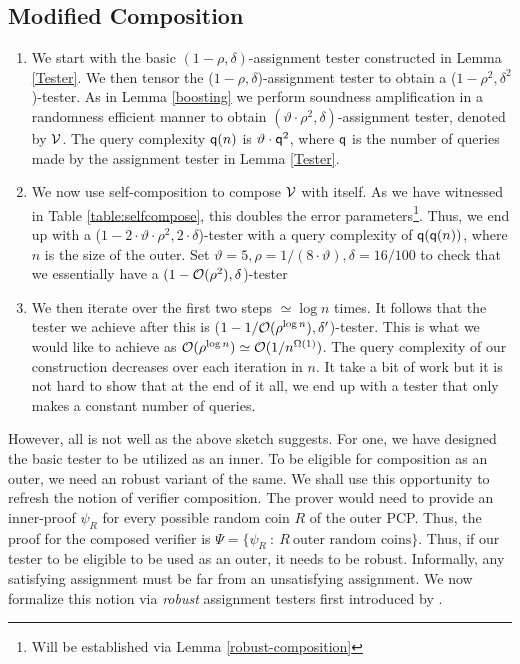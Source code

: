 \subsection*{Modified Composition}\label{modified}
\begin{enumerate}
\item We start with the basic $(1 - \rho,\delta)$-assignment tester
  constructed in Lemma \ref{Tester}. We then tensor the ($1 -
  \rho,\delta$)-assignment tester to obtain a ($1 -
  \rho^2,\delta^2$)-tester. As in Lemma \ref{boosting} we perform
  soundness amplification in a randomness efficient manner to obtain
  $(\vartheta \cdot \rho^2, \delta)$-assignment tester, denoted by
  ${\cal V}$. The query complexity ${\sf q}(n)$ is $\vartheta \cdot {\sf q}^2$,
  where ${\sf q}$ is the number of queries made by the assignment tester in
  Lemma \ref{Tester}.

\item We now use self-composition to compose ${\cal V}$ with
  itself. As we have witnessed in Table \ref{table:selfcompose}, this
  doubles the error parameters\footnote{Will be established via Lemma
    \ref{robust-composition}}. Thus, we end up with a ($ 1 - 2 \cdot
  \vartheta \cdot \rho^2, 2 \cdot \delta$)-tester with a query
  complexity of ${\sf q}({\sf q}(n))$, where $n$ is the size of the outer.  Set
  $\vartheta = 5 , \rho = 1/( 8 \cdot \vartheta), \delta = 16/100$ to
  check that we essentially have a $(1 - {\cal O}(\rho^2),
  \delta$)-tester
  
\item We then iterate over the first two steps $ \simeq \log n$ times.
  It follows that the tester we achieve after this is ($ 1 - 1/{\cal
    O}(\rho^{\log n}), \delta'$)-tester. This is what we would like to
  achieve as ${\cal O}(\rho^{\log n}) \simeq {\cal
    O}(1/n^{\Omega(1)})$. The query complexity of our construction
  decreases over each iteration in $n$. It take a bit of work but it
  is not hard to show that at the end of it all, we end up with a
  tester that only makes a constant number of queries.
\end{enumerate}

However, all is not well as the above sketch suggests. For one, we
have designed the basic tester to be utilized as an inner. To be
eligible for composition as an outer, we need an robust variant of the
same. We shall use this opportunity to refresh the notion of verifier
composition. The prover would need to provide an inner-proof
$\psi_{R}$ for every possible random coin $R$ of the outer PCP. Thus,
the proof for the composed verifier is $\Psi = \big\{ \psi_{R}\ :\ R \
\mbox{outer random coins} \big\}$. Thus, if our tester to be eligible
to be used as an outer, it needs to be robust. Informally, any
satisfying assignment must be far from an unsatisfying assignment.  We
now formalize this notion via {\em robust} assignment testers first
introduced by \cite{DR,BGHSV}.


